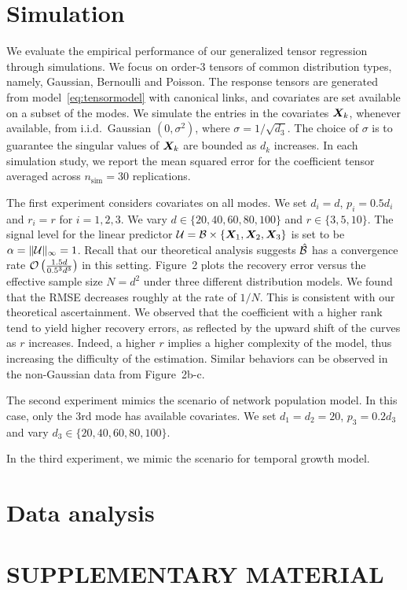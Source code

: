\documentclass[twoside]{article}
\theoremstyle{plain}
\theoremstyle{definition}
\begin{document}
\section{Simulation}\label{sec:simulation}
We evaluate the empirical performance of our generalized tensor regression through simulations. We focus on order-3 tensors of common distribution types, namely, Gaussian, Bernoulli and Poisson. The response tensors are generated from model~\eqref{eq:tensormodel} with canonical links, and covariates are set available on a subset of the modes. We simulate the entries in the covariates $\bm X_k$, whenever available, from i.i.d.\ Gaussian $(0,\sigma^2)$, where $\sigma=1/\sqrt{d_3}$. The choice of $\sigma$ is to guarantee the singular values of $\bm X_k$ are bounded as $d_k$ increases. In each simulation study, we report the mean squared error for the coefficient tensor averaged across $n_{\text{sim}}=30$ replications. 

The first experiment considers covariates on all modes. We set $d_i=d$, $p_i=0.5d_i$ and $r_i=r$ for $i=1,2,3$. We vary $d\in\{20,40,60,80,100\}$ and $r\in\{3,5,10\}$. The signal level for the linear predictor $\mathcal{U}=\mathcal{B}\times\{\bm X_1,\bm X_2,\bm X_3\}$ is set to be $\alpha= \lVert\mathcal{U}\rVert_\infty=1$. Recall that our theoretical analysis suggests $\hat {\mathcal{B}}$ has a convergence rate $\mathcal{O}\left({1.5d \over 0.5^3d^3}\right)$ in this setting. Figure~2 plots the recovery error versus the effective sample size $N=d^2$ under three different distribution models. We found that the RMSE decreases roughly at the rate of $1/N$. This is consistent with our theoretical ascertainment. We observed that the coefficient with a higher rank tend to yield higher recovery errors, as reflected by the upward shift of the curves as $r$ increases. Indeed, a higher $r$ implies a higher complexity of the model, thus increasing the difficulty of the estimation. Similar behaviors can be observed in the non-Gaussian data from Figure~2b-c. 



The second experiment mimics the scenario of network population model. In this case, only the 3rd mode has available covariates. 
We set $d_1=d_2=20$, $p_3=0.2d_3$ and vary $d_3\in \{20, 40, 60, 80, 100\}$. 


In the third experiment, we mimic the scenario for temporal growth model. 
\section{Data analysis}
\section{SUPPLEMENTARY MATERIAL}
\end{document}
